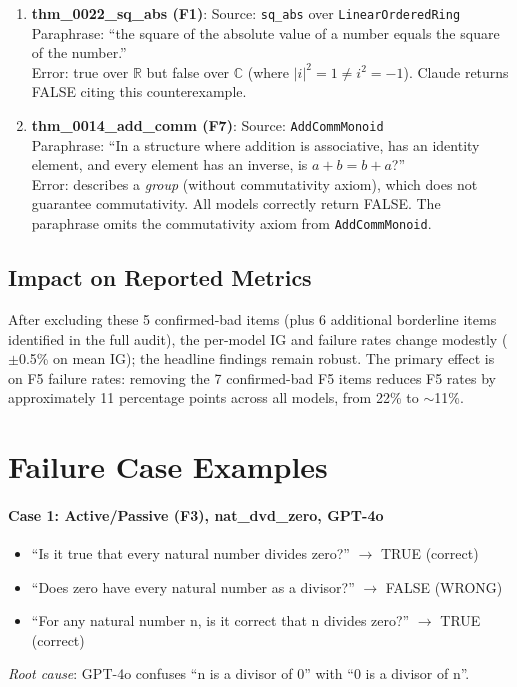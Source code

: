 \documentclass{article}
\begin{document}
\begin{enumerate}
\item \textbf{thm\_0022\_sq\_abs (F1)}: Source: \texttt{sq\_abs} over \texttt{LinearOrderedRing} \\
Paraphrase: ``the square of the absolute value of a number equals the square of the number.'' \\
Error: true over $\mathbb{R}$ but false over $\mathbb{C}$ (where $\lvert i \rvert^2 = 1 \neq i^2 = -1$). Claude returns FALSE citing this counterexample.

\item \textbf{thm\_0014\_add\_comm (F7)}: Source: \texttt{AddCommMonoid} \\
Paraphrase: ``In a structure where addition is associative, has an identity element, and every element has an inverse, is $a + b = b + a$?'' \\
Error: describes a \emph{group} (without commutativity axiom), which does not guarantee commutativity. All models correctly return FALSE. The paraphrase omits the commutativity axiom from \texttt{AddCommMonoid}.
\end{enumerate}

\subsection*{Impact on Reported Metrics}

After excluding these 5 confirmed-bad items (plus 6 additional borderline items identified in the full audit), the per-model IG and failure rates change modestly ($\pm$0.5\% on mean IG); the headline findings remain robust. The primary effect is on F5 failure rates: removing the 7 confirmed-bad F5 items reduces F5 rates by approximately 11 percentage points across all models, from 22\% to $\sim$11\%.

\section{Failure Case Examples}
\label{app:failures}

\paragraph{Case 1: Active/Passive (F3), nat\_dvd\_zero, GPT-4o}
\begin{itemize}
\item ``Is it true that every natural number divides zero?'' $\to$ TRUE (correct)
\item ``Does zero have every natural number as a divisor?'' $\to$ FALSE (WRONG)
\item ``For any natural number n, is it correct that n divides zero?'' $\to$ TRUE (correct)
\end{itemize}
\textit{Root cause}: GPT-4o confuses ``n is a divisor of 0'' with ``0 is a divisor of n''.
\end{document}
